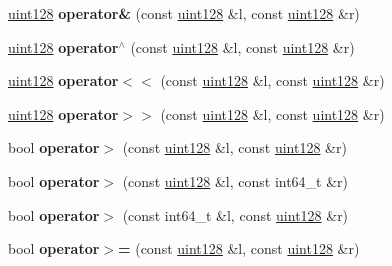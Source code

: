 \begin{DoxyCompactItemize}
\mbox{\hyperlink{classfc_1_1uint128}{uint128}} {\bfseries operator\&} (const \mbox{\hyperlink{classfc_1_1uint128}{uint128}} \&l, const \mbox{\hyperlink{classfc_1_1uint128}{uint128}} \&r)
\item 
\mbox{\label{classfc_1_1uint128_a94344f881457546308362484d2a1c1b8}} 
\mbox{\hyperlink{classfc_1_1uint128}{uint128}} {\bfseries operator$^\wedge$} (const \mbox{\hyperlink{classfc_1_1uint128}{uint128}} \&l, const \mbox{\hyperlink{classfc_1_1uint128}{uint128}} \&r)
\item 
\mbox{\label{classfc_1_1uint128_af4ec8c395e1cddcd28a4b21ea568962e}} 
\mbox{\hyperlink{classfc_1_1uint128}{uint128}} {\bfseries operator$<$$<$} (const \mbox{\hyperlink{classfc_1_1uint128}{uint128}} \&l, const \mbox{\hyperlink{classfc_1_1uint128}{uint128}} \&r)
\item 
\mbox{\label{classfc_1_1uint128_aa6452c8fac70b23fde75371b23b5f322}} 
\mbox{\hyperlink{classfc_1_1uint128}{uint128}} {\bfseries operator$>$$>$} (const \mbox{\hyperlink{classfc_1_1uint128}{uint128}} \&l, const \mbox{\hyperlink{classfc_1_1uint128}{uint128}} \&r)
\item 
\mbox{\label{classfc_1_1uint128_ad29f0b6bc894e9cfe86e51e3f3d06c3e}} 
bool {\bfseries operator$>$} (const \mbox{\hyperlink{classfc_1_1uint128}{uint128}} \&l, const \mbox{\hyperlink{classfc_1_1uint128}{uint128}} \&r)
\item 
\mbox{\label{classfc_1_1uint128_a2892613c1092ef18e939c0db760e95ad}} 
bool {\bfseries operator$>$} (const \mbox{\hyperlink{classfc_1_1uint128}{uint128}} \&l, const int64\+\_\+t \&r)
\item 
\mbox{\label{classfc_1_1uint128_a8487d1898fd9baf19d9daccf7b739ca1}} 
bool {\bfseries operator$>$} (const int64\+\_\+t \&l, const \mbox{\hyperlink{classfc_1_1uint128}{uint128}} \&r)
\item 
\mbox{\label{classfc_1_1uint128_ab23775fb24f8ebfc17083c06021c7d9f}} 
bool {\bfseries operator$>$=} (const \mbox{\hyperlink{classfc_1_1uint128}{uint128}} \&l, const \mbox{\hyperlink{classfc_1_1uint128}{uint128}} \&r)
\item 

\end{DoxyCompactItemize}
